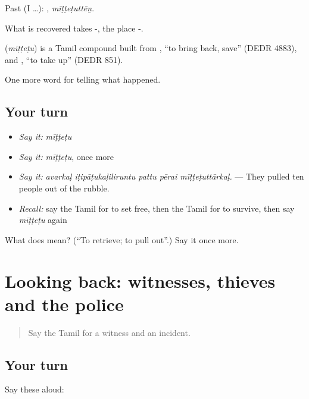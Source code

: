 Past (I …): , \emph{mīṭṭeṭuttēṉ}.

What is recovered takes -, the place -.

\begin{cousinweb}
\textbf{} (\emph{mīṭṭeṭu}) is a Tamil compound built from , \textquotedblleft{}to bring back, save\textquotedblright{} (DEDR 4883), and , \textquotedblleft{}to take up\textquotedblright{} (DEDR 851).
\end{cousinweb}

\begin{grammarlens}[title={What you've built}]
One more word for telling what happened.
\end{grammarlens}

\subsection*{Your turn}
\begin{itemize}
\raggedright
  \item \emph{Say it:} \emph{mīṭṭeṭu}
  \item \emph{Say it:} \emph{mīṭṭeṭu}, once more
  \item \emph{Say it:} \emph{avarkaḷ iṭipāṭukaḷiliruntu pattu pērai mīṭṭeṭuttārkaḷ.} — They pulled ten people out of the rubble.
  \item \emph{Recall:} say the Tamil for to set free, then the Tamil for to survive, then say \emph{mīṭṭeṭu} again
\end{itemize}

\begin{tcolorbox}[breakable,colback=teal!4,colframe=teal!35!black,title={Before you move on}]
What does  mean? (\textquotedblleft{}To retrieve; to pull out\textquotedblright{}.) Say it once more.
\end{tcolorbox}
\section[(dialogue)]{Looking back: witnesses, thieves and the police}

\label{lesson:TA-R301-review-294-301}



\begin{quote}
Say the Tamil for a witness and an incident.
\end{quote}

\subsection*{Your turn}
Say these aloud:

